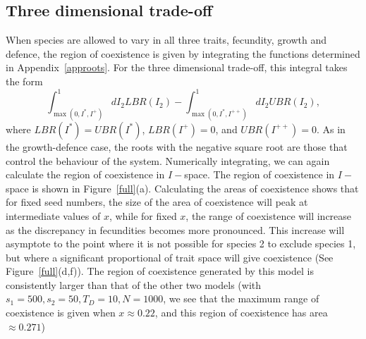 \subsection{Three dimensional trade-off}
When species are allowed to vary in all three traits, fecundity, growth and defence, the region of coexistence is given by integrating the functions determined in Appendix~\ref{approots}. For the three dimensional trade-off, this integral takes the form
\begin{equation}
\int_{\max(0,I^*,I^+)}^1 dI_2 LBR(I_2) - \int_{\max(0,I^*,I^{++})}^1 dI_2 UBR(I_2),
\end{equation}
where $LBR(I^*)=UBR(I^*)$, $LBR(I^+)=0$, and $UBR(I^{++})=0$. As in the growth-defence case, the roots with the negative square root are those that control the behaviour of the system. Numerically integrating, we can again calculate the region of coexistence in $I-$space. The region of coexistence in $I-$space is shown in Figure~\ref{full}(a). Calculating the areas of coexistence shows that for fixed seed numbers, the size of the area of coexistence will peak at intermediate values of $x$, while for fixed $x$, the range of coexistence will increase as the discrepancy in fecundities becomes more pronounced. This increase will asymptote to the point where it is not possible for species 2 to exclude species 1, but where a significant proportional of trait space will give coexistence (See Figure~\ref{full}(d,f)). The region of coexistence generated by this model is consistently larger than that of the other two models (with $s_1=500,s_2=50,T_D=10,N=1000$, we see that the maximum range of coexistence is given when $x\approx 0.22$, and this region of coexistence has area $\approx 0.271$)
